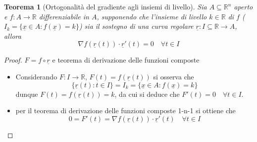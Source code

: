 \documentclass[12pt, a4paper]{article}
\theoremstyle{break}
\newtheorem{theorem}{Teorema} %
\begin{document}
\newpage
\begin{theorem} [Ortogonalità del gradiente agli insiemi di livello]
	Sia $A \subseteq \mathbb{R}^n$ aperto e $f: A \to \mathbb{R}$
	differenziabile in $A$, supponendo che l'insieme di livello $k \in
		\mathbb{R}$ di $f$ ($I_k = \{\underline{x} \in A: f(\underline{x}) = k
		\}$) sia il sostegno di una curva regolare $\underline{r}: I \subseteq
		\mathbb{R} \to A$, allora
	\[
		\nabla f(\underline{r}(t)) \cdot \underline{r}'(t) = 0 \quad \forall t
		\in I
	\]
\end{theorem}
\begin{proof} $F = f \circ \underline{r}$ e teorema di derivazione
	delle funzioni composte
	\begin{itemize}
		\item Considerando $F:I \to \mathbb{R}$, $F(t) = f(\underline{r}(t))$
		      si osserva che
		      \[
			      \{\underline{r}(t): t \in I\} = I_k = \{\underline{x} \in A:
			      f(\underline{x}) = k \}
		      \]
		      dunque $F(t) = f(\underline{r}(t)) = k$, da cui si deduce che
		      $F'(t) = 0 \quad \forall t \in I$.
		\item per il teorema di derivazione delle funzioni composte 1-n-1 si
		      ottiene che
		      \[
			      0 = F'(t) = \nabla f(\underline{r}(t)) \cdot \underline{r}'(t) 
			      \quad \forall t \in I
		      \]
	\end{itemize}
\end{proof}
\end{document}
